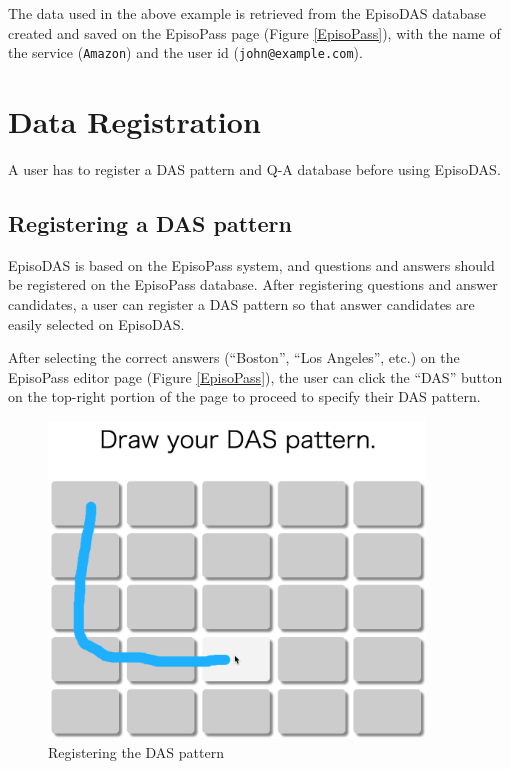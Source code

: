 \documentclass[sigconf]{acmart}
\begin{document}
The data used in the above example is retrieved from the EpisoDAS database
created and saved on the EpisoPass page (Figure \ref{EpisoPass}),
with the name of the service (\texttt{Amazon})
and the user id (\texttt{john@example.com}).

\section{Data Registration}

A user has to register a DAS pattern and
Q-A database before using EpisoDAS.

\subsection{Registering a DAS pattern}

EpisoDAS is based on the EpisoPass system,
and questions and answers should be registered on the EpisoPass database.
After registering questions and answer candidates,
a user can register a DAS pattern so that
answer candidates are easily selected on EpisoDAS.


After selecting the correct answers
(``Boston'', ``Los Angeles'', etc.) on the EpisoPass editor page (Figure \ref{EpisoPass}),
the user can click the ``DAS'' button on the top-right portion of the
page to proceed to specify their DAS pattern.

\begin{figure}[H]
  \includegraphics[width=10cm,bb=-60 0 1272 1118]{figures/DASRegister.png}
  \caption{Registering the DAS pattern}
  \label{DASRegister}
\end{figure}
\end{document}
